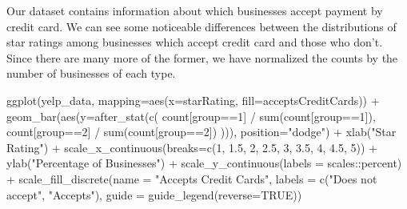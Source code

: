 \documentclass[
  12pt,
  letterpaper,
  DIV=11,
  numbers=noendperiod]{scrartcl}
\newenvironment{Shaded}{\begin{snugshade}}{\end{snugshade}}
\newcommand{\AttributeTok}[1]{\textcolor[rgb]{0.98,0.46,0.51}{#1}}
\newcommand{\ConstantTok}[1]{\textcolor[rgb]{0.47,0.72,1.00}{#1}}
\newcommand{\DecValTok}[1]{\textcolor[rgb]{0.47,0.72,1.00}{#1}}
\newcommand{\FloatTok}[1]{\textcolor[rgb]{0.47,0.72,1.00}{#1}}
\newcommand{\FunctionTok}[1]{\textcolor[rgb]{0.70,0.57,0.94}{#1}}
\newcommand{\NormalTok}[1]{\textcolor[rgb]{0.88,0.89,0.91}{#1}}
\newcommand{\SpecialCharTok}[1]{\textcolor[rgb]{0.47,0.72,1.00}{#1}}
\newcommand{\StringTok}[1]{\textcolor[rgb]{0.62,0.80,1.00}{#1}}
\begin{document}
Our dataset contains information about which businesses accept payment
by credit card. We can see some noticeable differences between the
distributions of star ratings among businesses which accept credit card
and those who don't. Since there are many more of the former, we have
normalized the counts by the number of businesses of each type.

\begin{Shaded}
\begin{Highlighting}[]
\FunctionTok{ggplot}\NormalTok{(yelp\_data, }\AttributeTok{mapping=}\FunctionTok{aes}\NormalTok{(}\AttributeTok{x=}\NormalTok{starRating, }\AttributeTok{fill=}\NormalTok{acceptsCreditCards)) }\SpecialCharTok{+}
  \FunctionTok{geom\_bar}\NormalTok{(}\FunctionTok{aes}\NormalTok{(}\AttributeTok{y=}\FunctionTok{after\_stat}\NormalTok{(}\FunctionTok{c}\NormalTok{(}
\NormalTok{    count[group}\SpecialCharTok{==}\DecValTok{1}\NormalTok{] }\SpecialCharTok{/} \FunctionTok{sum}\NormalTok{(count[group}\SpecialCharTok{==}\DecValTok{1}\NormalTok{]),}
\NormalTok{    count[group}\SpecialCharTok{==}\DecValTok{2}\NormalTok{] }\SpecialCharTok{/} \FunctionTok{sum}\NormalTok{(count[group}\SpecialCharTok{==}\DecValTok{2}\NormalTok{])}
\NormalTok{  ))), }\AttributeTok{position=}\StringTok{"dodge"}\NormalTok{) }\SpecialCharTok{+}
  \FunctionTok{xlab}\NormalTok{(}\StringTok{"Star Rating"}\NormalTok{) }\SpecialCharTok{+}
  \FunctionTok{scale\_x\_continuous}\NormalTok{(}\AttributeTok{breaks=}\FunctionTok{c}\NormalTok{(}\DecValTok{1}\NormalTok{, }\FloatTok{1.5}\NormalTok{, }\DecValTok{2}\NormalTok{, }\FloatTok{2.5}\NormalTok{, }\DecValTok{3}\NormalTok{, }\FloatTok{3.5}\NormalTok{, }\DecValTok{4}\NormalTok{, }\FloatTok{4.5}\NormalTok{, }\DecValTok{5}\NormalTok{)) }\SpecialCharTok{+}
  \FunctionTok{ylab}\NormalTok{(}\StringTok{"Percentage of Businesses"}\NormalTok{) }\SpecialCharTok{+}
  \FunctionTok{scale\_y\_continuous}\NormalTok{(}\AttributeTok{labels =}\NormalTok{ scales}\SpecialCharTok{::}\NormalTok{percent) }\SpecialCharTok{+}
  \FunctionTok{scale\_fill\_discrete}\NormalTok{(}\AttributeTok{name =} \StringTok{"Accepts Credit Cards"}\NormalTok{, }\AttributeTok{labels =} \FunctionTok{c}\NormalTok{(}\StringTok{"Does not accept"}\NormalTok{, }\StringTok{"Accepts"}\NormalTok{), }\AttributeTok{guide =} \FunctionTok{guide\_legend}\NormalTok{(}\AttributeTok{reverse=}\ConstantTok{TRUE}\NormalTok{))}
\end{Highlighting}
\end{Shaded}
\end{document}
